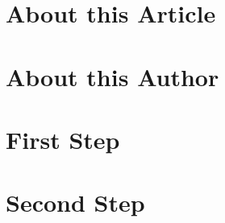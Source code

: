 \documentclass{article}
\begin{document}
\tableofcontents
\section*{About this Article}

\section*{About this Author} 

\section{First Step}
\section{Second Step}
\end{document}
